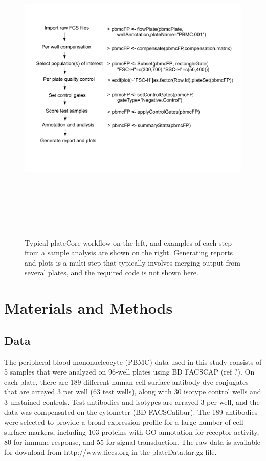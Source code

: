 \documentclass[12pt]{article}
\begin{document}
\begin{figure}
\centering
\includegraphics[width=7in,height=6in]{analysisSteps.pdf}
\caption{Typical plateCore workflow on the left, and examples of each step from a sample analysis are shown on the right.
Generating reports and plots is a multi-step that typically involves merging output from several plates, and the required
code is not shown here.}
\label{fig:analysis}
\end{figure}
 
\clearpage
\section*{Materials and Methods}
\subsection*{Data}

The peripheral blood mononucleocyte (PBMC) data used in this study consists of 5 samples that were analyzed on 96-well plates
using BD FACS\texttrademark CAP (ref ?). On each plate, there are 189 different human cell surface antibody-dye conjugates that
are arrayed 3 per well (63 test wells), along with 30 isotype control wells and 3 unstained controls.
Test antibodies and isotypes are arrayed 3 per well, and the data was compensated
on the cytometer (BD FACSCalibur\texttrademark). The 189 antibodies were selected to provide a broad expression profile
for a large number of cell surface markers, including 103 proteins with GO annotation for receptor activity, 80
for immune response, and 55 for signal transduction. The raw data is available for download from http://www.ficcs.org in the
plateData.tar.gz file. 
\end{document}
